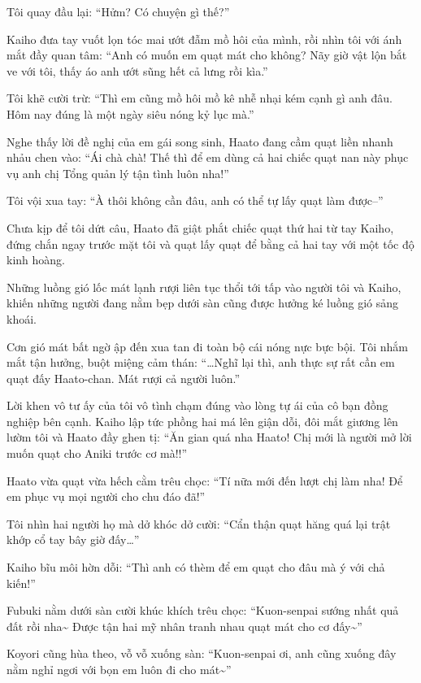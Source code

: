 \documentclass[../main.tex]{subfiles}
\begin{document}
Tôi quay đầu lại: ``Hửm? Có chuyện gì thế?''

Kaiho đưa tay vuốt lọn tóc mai ướt đẫm mồ hôi của mình, rồi nhìn tôi với ánh mắt đầy quan tâm: ``Anh có muốn em quạt mát cho không? Nãy giờ vật lộn bắt ve với tôi, thấy áo anh ướt sũng hết cả lưng rồi kìa.''

Tôi khẽ cười trừ: ``Thì em cũng mồ hôi mồ kê nhễ nhại kém cạnh gì anh đâu. Hôm nay đúng là một ngày siêu nóng kỷ lục mà.''

Nghe thấy lời đề nghị của em gái song sinh, Haato đang cầm quạt liền nhanh nhảu chen vào: ``Ái chà chà! Thế thì để em dùng cả hai chiếc quạt nan này phục vụ anh chị Tổng quản lý tận tình luôn nha!''

Tôi vội xua tay: ``À thôi không cần đâu, anh có thể tự lấy quạt làm được--''

Chưa kịp để tôi dứt câu, Haato đã giật phắt chiếc quạt thứ hai từ tay Kaiho, đứng chắn ngay trước mặt tôi và quạt lấy quạt để bằng cả hai tay với một tốc độ kinh hoàng.

Những luồng gió lốc mát lạnh rượi liên tục thổi tới tấp vào người tôi và Kaiho, khiến những người đang nằm bẹp dưới sàn cũng được hưởng ké luồng gió sảng khoái.

Cơn gió mát bất ngờ ập đến xua tan đi toàn bộ cái nóng nực bực bội. Tôi nhắm mắt tận hưởng, buột miệng cảm thán: ``\dots Nghĩ lại thì, anh thực sự rất cần em quạt đấy Haato-chan. Mát rượi cả người luôn.''

Lời khen vô tư ấy của tôi vô tình chạm đúng vào lòng tự ái của cô bạn đồng nghiệp bên cạnh. Kaiho lập tức phồng hai má lên giận dỗi, đôi mắt giương lên lườm tôi và Haato đầy ghen tị: ``Ăn gian quá nha Haato! Chị mới là người mở lời muốn quạt cho Aniki trước cơ mà!!''

Haato vừa quạt vừa hếch cằm trêu chọc: ``Tí nữa mới đến lượt chị làm nha! Để em phục vụ mọi người cho chu đáo đã!''

Tôi nhìn hai người họ mà dở khóc dở cười: ``Cẩn thận quạt hăng quá lại trật khớp cổ tay bây giờ đấy\dots''

Kaiho bĩu môi hờn dỗi: ``Thì anh có thèm để em quạt cho đâu mà ý với chả kiến!''

Fubuki nằm dưới sàn cười khúc khích trêu chọc: ``Kuon-senpai sướng nhất quả đất rồi nha\~{} Được tận hai mỹ nhân tranh nhau quạt mát cho cơ đấy\~{}''

Koyori cũng hùa theo, vỗ vỗ xuống sàn: ``Kuon-senpai ơi, anh cũng xuống đây nằm nghỉ ngơi với bọn em luôn đi cho mát\~{}''
\end{document}
